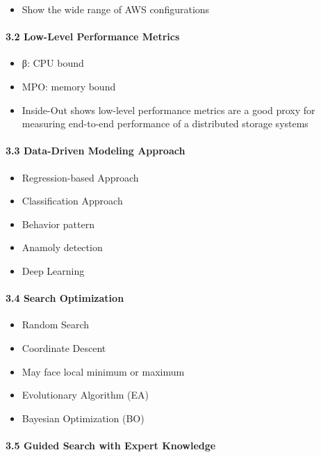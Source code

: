 \iffalse
\begin{itemize}
\item
  Show the wide range of AWS configurations
\end{itemize}

\paragraph{3.2 Low-Level Performance
Metrics}\label{low-level-performance-metrics}

\begin{itemize}
\item
  β: CPU bound
\item
  MPO: memory bound
\item
  Inside-Out shows low-level performance metrics are a good proxy for
  measuring end-to-end performance of a distributed storage systems
\end{itemize}

\paragraph{3.3 Data-Driven Modeling
Approach}\label{data-driven-modeling-approach}

\begin{itemize}
\item
  Regression-based Approach
\item
  Classification Approach
\item
  Behavior pattern
\item
  Anamoly detection
\item
  Deep Learning
\end{itemize}

\paragraph{3.4 Search Optimization}\label{search-optimization}

\begin{itemize}
\item
  Random Search
\item
  Coordinate Descent
\item
  May face local minimum or maximum
\item
  Evolutionary Algorithm (EA)
\item
  Bayesian Optimization (BO)
\end{itemize}

\paragraph{3.5 Guided Search with Expert
Knowledge}\label{guided-search-with-expert-knowledge}

